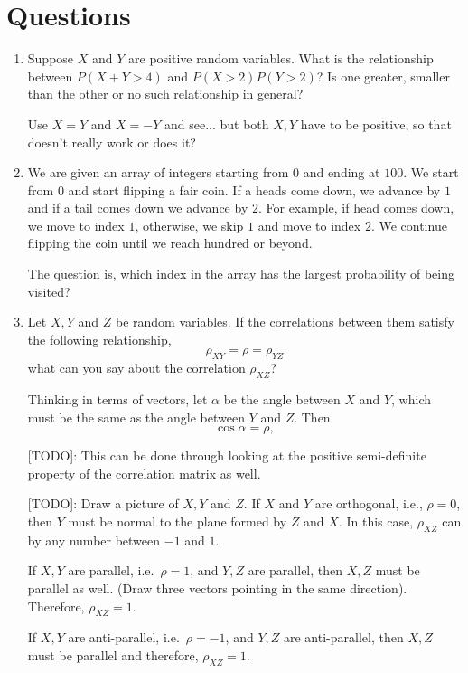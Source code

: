 \documentclass{amsart}
\theoremstyle{plain}
\numberwithin{equation}{section}
\begin{document}
\section*{Questions}
\begin{enumerate}
\item Suppose $X$ and $Y$ are positive 
random variables. What is the relationship between
$P(X+Y>4)$ and $P(X>2)P(Y>2)$? Is one greater, smaller
than the other or no such relationship in general?

Use $X=Y$ and $X=-Y$ and see... but both $X,Y$ 
have to be positive, so that doesn't really work or does it?

\item We are given an array of integers starting 
from $0$ and ending at $100$. We start from $0$ and 
start flipping a fair coin. If a heads come down, 
we advance by $1$ and if a tail comes down 
we advance by $2$. For example, if head comes down, we move
to index $1$, otherwise, we skip $1$ and move to index $2$. 
We continue flipping the coin until we 
reach hundred or beyond. 

The question is, which index in the array has the 
largest probability of being visited?  


 
\item Let $X, Y$ and $Z$ be random 
variables. If the correlations between 
them satisfy the following relationship,
$$\rho_{XY} = \rho = \rho_{YZ}$$
what can you say about the correlation
$\rho_{XZ}$?

Thinking in terms of vectors, let $\alpha$ be 
the angle between $X$ and $Y$, which must be the 
same as the angle between $Y$ and $Z$. Then
$$\cos \alpha = \rho,$$

[TODO]: This can be done through looking at
the positive semi-definite property of the correlation matrix as 
well.

[TODO]: Draw a picture of $X, Y$ and $Z$.
If $X$ and $Y$ are orthogonal, i.e., $\rho = 0$, 
then $Y$ must be normal to the plane 
formed by $Z$ and $X$. In this case, $\rho_{XZ}$ can 
by any number between $-1$ and $1$. 

If $X, Y$ are parallel, i.e.\ $\rho = 1$, and 
$Y, Z$ are parallel, then $X, Z$ must be parallel 
as well. (Draw three vectors pointing in the 
same direction). Therefore, $\rho_{XZ} = 1$.

If $X,Y$ are anti-parallel, i.e.\ $\rho = -1$, and 
$Y, Z$ are anti-parallel, then $X, Z$ must be 
parallel and therefore, $\rho_{XZ}=1$.


\end{enumerate}
\end{document}
